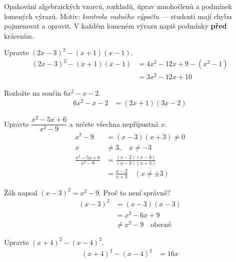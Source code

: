 \documentclass[11pt,a4paper]{article}
\begin{document}
Opakování algebraických vzorců, rozkladů, úprav mnohočlenů a podmínek lomených výrazů. Motiv: \emph{kontrola vadného výpočtu} — studenti mají chybu pojmenovat a opravit. V každém lomeném výrazu napiš podmínky \textbf{před} krácením.
\begin{prikladReseniBox}[title={Příklad 1}]
Upravte $(2x-3)^2-(x+1)(x-1)$.
\tcblower
\[
\begin{aligned}
(2x-3)^2-(x+1)(x-1)&=4x^2-12x+9-(x^2-1)\\
&=3x^2-12x+10
\end{aligned}
\]

\end{prikladReseniBox}
\begin{prikladReseniBox}[title={Příklad 2}]
Rozložte na součin $6x^2-x-2$.
\tcblower
\[
\begin{aligned}
6x^2-x-2&=(2x+1)(3x-2)
\end{aligned}
\]

\end{prikladReseniBox}
\begin{prikladReseniBox}[title={Příklad 3}]
Upravte $\dfrac{x^2-5x+6}{x^2-9}$ a určete všechna nepřípustná $x$.
\tcblower
\[
\begin{aligned}
x^2-9&=(x-3)(x+3)\ne0\\
x&\ne3,\quad x\ne-3\\
\frac{x^2-5x+6}{x^2-9}&=\frac{(x-2)(x-3)}{(x-3)(x+3)}\\
&=\frac{x-2}{x+3}\quad(x\ne\pm3)
\end{aligned}
\]

\end{prikladReseniBox}
\begin{prikladReseniBox}[title={Příklad 4}]
Žák napsal $(x-3)^2=x^2-9$. Proč to není správně?
\tcblower
\[
\begin{aligned}
(x-3)^2&=(x-3)(x-3)\\
&=x^2-6x+9\\
&\ne x^2-9\quad\text{obecně}
\end{aligned}
\]

\end{prikladReseniBox}
\begin{zadaniReseniBox}[title={Samostatná práce 1}]
Upravte $(x+4)^2-(x-4)^2$.
\tcblower
\[
\begin{aligned}
(x+4)^2-(x-4)^2&=16x
\end{aligned}
\]

\end{zadaniReseniBox}
\end{document}
